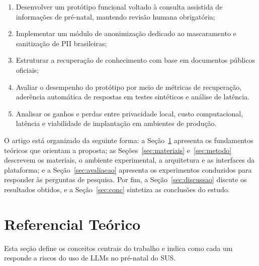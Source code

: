 \documentclass[12pt]{article}
\begin{document}
\begin{enumerate}
  \item Desenvolver um protótipo funcional voltado à consulta assistida de informações de pré-natal, mantendo revisão humana obrigatória;
  \item Implementar um módulo de anonimização dedicado ao mascaramento e sanitização de PII brasileiras;
  \item Estruturar a recuperação de conhecimento com base em documentos públicos oficiais;
  \item Avaliar o desempenho do protótipo por meio de métricas de recuperação, aderência automática de respostas em testes sintéticos e análise de latência.
  \item Analisar os ganhos e perdas entre privacidade local, custo computacional, latência e viabilidade de implantação em ambientes de produção.
\end{enumerate}

O artigo está organizado da seguinte forma: a Seção~\ref{sec:ref} apresenta os fundamentos teóricos que orientam a proposta; as Seções~\ref{sec:materiais} e~\ref{sec:metodo} descrevem os materiais, o ambiente experimental, a arquitetura e as interfaces da plataforma; e a Seção~\ref{sec:avaliacao} apresenta os experimentos conduzidos para responder às perguntas de pesquisa. Por fim, a Seção~\ref{sec:discussao} discute os resultados obtidos, e a Seção~\ref{sec:conc} sintetiza as conclusões do estudo.


\section{Referencial Teórico}\label{sec:ref}

Esta seção define os conceitos centrais do trabalho e indica como cada um responde a riscos do uso de LLMs no pré-natal do SUS.
\end{document}
